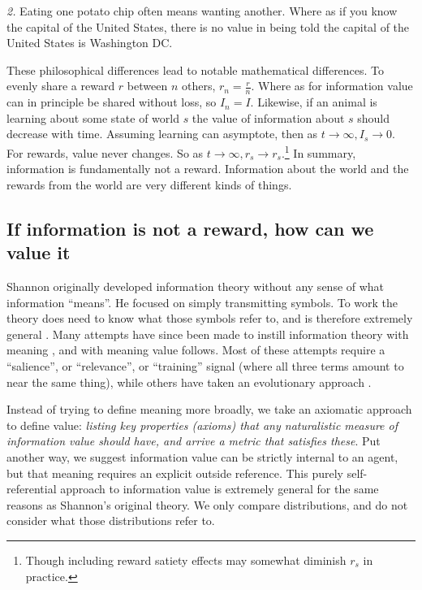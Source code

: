 \documentclass[9pt,twocolumn,twoside]{pnas-new}
\begin{document}
\textit{2.} Eating one potato chip often means wanting another. Where as if you know the capital of the United States, there is no value in being told the capital of the United States is Washington DC.

These philosophical differences lead to notable mathematical differences. To evenly share a reward $r$ between $n$ others, $r_n = \frac{r}{n}$. Where as for information value can in principle be shared without loss, so $I_n = I$. Likewise, if an animal is learning about some state of world $s$ the value of information about $s$ should decrease with time. Assuming learning can asymptote, then as $t \rightarrow \infty, I_s \rightarrow 0$. For rewards, value never changes. So as $t \rightarrow \infty, r_s \rightarrow r_s$.\footnote{Though including reward satiety effects may somewhat diminish $r_s$ in practice.} In summary, information is fundamentally not a reward. Information about the world and the rewards from the world are very different kinds of things.

    
\subsection*{If information is not a reward, how can we value it}
Shannon originally developed information theory without any sense of what information ``means''. He focused on simply transmitting symbols. To work the theory does need to know what those symbols refer to, and is therefore extremely general \citep{Shannon1948}. Many attempts have since been made to instill information theory with meaning \citep{Kolchinsky2018}, and with meaning value follows. Most of these attempts require a ``salience'', or ``relevance'', or ``training'' signal (where all three terms amount to near the same thing), while others have taken an evolutionary approach \citep{Kolchinsky2018}.  

Instead of trying to define meaning more broadly, we take an axiomatic approach to define value: \textit{listing key properties (axioms) that any naturalistic measure of information value should have, and arrive a metric that satisfies these}. Put another way, we suggest information value can be strictly internal to an agent, but that meaning requires an explicit outside reference. This purely self-referential approach to information value is extremely general for the same reasons as Shannon's original theory. We only compare distributions, and do not consider what those distributions refer to.
\end{document}
